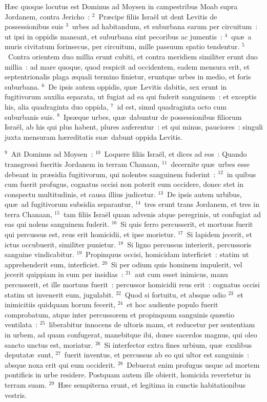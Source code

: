 \lettrine[lines=3,image=true,loversize=0.05,lraise=-0.03]{H}{}\ae c quoque locutus est Dominus ad Moysen in campestribus Moab supra Jordanem, contra Jericho~:
${}^{2}$~Pr\ae cipe filiis Isra\"el ut dent Levitis de possessionibus suis
${}^{3}$~urbes ad habitandum, et suburbana earum per circuitum~: ut ipsi in oppidis maneant, et suburbana sint pecoribus ac jumentis~:
${}^{4}$~qu\ae\ a muris civitatum forinsecus, per circuitum, mille passuum spatio tendentur.
${}^{5}$~Contra orientem duo millia erunt cubiti, et contra meridiem similiter erunt duo millia~: ad mare quoque, quod respicit ad occidentem, eadem mensura erit, et septentrionalis plaga \ae quali termino finietur, eruntque urbes in medio, et foris suburbana.
${}^{6}$~De ipsis autem oppidis, qu\ae\ Levitis dabitis, sex erunt in fugitivorum auxilia separata, ut fugiat ad ea qui fuderit sanguinem~: et exceptis his, alia quadraginta duo oppida,
${}^{7}$~id est, simul quadraginta octo cum suburbanis suis.
${}^{8}$~Ips\ae que urbes, qu\ae\ dabuntur de possessionibus filiorum Isra\"el, ab his qui plus habent, plures auferentur~: et qui minus, pauciores~: singuli juxta mensuram h\ae reditatis su\ae\ dabunt oppida Levitis.


${}^{9}$~Ait Dominus ad Moysen~:
${}^{10}$~Loquere filiis Isra\"el, et dices ad eos~: Quando transgressi fueritis Jordanem in terram Chanaan,
${}^{11}$~decernite qu\ae\ urbes esse debeant in pr\ae sidia fugitivorum, qui nolentes sanguinem fuderint~:
${}^{12}$~in quibus cum fuerit profugus, cognatus occisi non poterit eum occidere, donec stet in conspectu multitudinis, et causa illius judicetur.
${}^{13}$~De ipsis autem urbibus, qu\ae\ ad fugitivorum subsidia separantur,
${}^{14}$~tres erunt trans Jordanem, et tres in terra Chanaan,
${}^{15}$~tam filiis Isra\"el quam advenis atque peregrinis, ut confugiat ad eas qui nolens sanguinem fuderit.
${}^{16}$~Si quis ferro percusserit, et mortuus fuerit qui percussus est, reus erit homicidii, et ipse morietur.
${}^{17}$~Si lapidem jecerit, et ictus occubuerit, similiter punietur.
${}^{18}$~Si ligno percussus interierit, percussoris sanguine vindicabitur.
${}^{19}$~Propinquus occisi, homicidam interficiet~: statim ut apprehenderit eum, interficiet.
${}^{20}$~Si per odium quis hominem impulerit, vel jecerit quippiam in eum per insidias~:
${}^{21}$~aut cum esset inimicus, manu percusserit, et ille mortuus fuerit~: percussor homicidii reus erit~: cognatus occisi statim ut invenerit eum, jugulabit.
${}^{22}$~Quod si fortuitu, et absque odio
${}^{23}$~et inimicitiis quidquam horum fecerit,
${}^{24}$~et hoc audiente populo fuerit comprobatum, atque inter percussorem et propinquum sanguinis qu\ae stio ventilata~:
${}^{25}$~liberabitur innocens de ultoris manu, et reducetur per sententiam in urbem, ad quam confugerat, manebitque ibi, donec sacerdos magnus, qui oleo sancto unctus est, moriatur.
${}^{26}$~Si interfector extra fines urbium, qu\ae\ exulibus deputat\ae\ sunt,
${}^{27}$~fuerit inventus, et percussus ab eo qui ultor est sanguinis~: absque noxa erit qui eum occiderit.
${}^{28}$~Debuerat enim profugus usque ad mortem pontificis in urbe residere. Postquam autem ille obierit, homicida revertetur in terram suam.
${}^{29}$~H\ae c sempiterna erunt, et legitima in cunctis habitationibus vestris.


